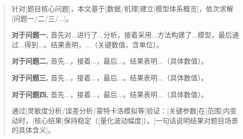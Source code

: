 
\begin{abstract}

针对[题目核心问题]，本文基于[数据/机理]建立[模型体系概览]，依次求解[问题一/二/三/...]。

\textbf{对于问题一,} 首先对...进行了...分析，接着采用...方法构建了...模型，最后通过...得到...。结果表明，...（关键数值，含单位）。

\textbf{对于问题二,} 首先...，接着...，最后...。结果表明...（具体数值）。

\textbf{对于问题三,} 首先...，接着...，最后...。结果表明...（具体数值）。

\textbf{对于问题四,} 首先...，接着...，最后...。结果表明...（具体数值）。

通过[灵敏度分析/误差分析/蒙特卡洛模拟等]验证：[关键参数]在[范围]内变动时，[核心结果]保持稳定（[量化波动幅度]）。[一句话说明结果对题目场景的具体含义]。



\end{abstract}

